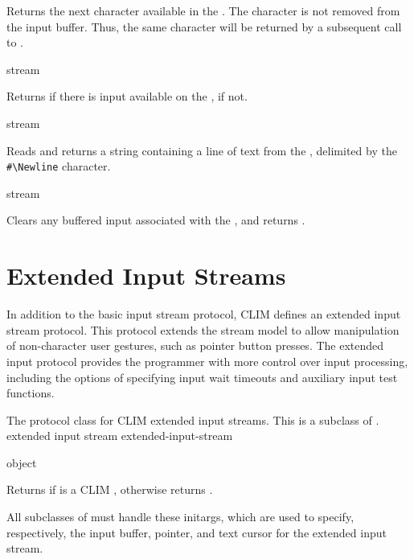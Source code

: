 Returns the next character available in the  .
The character is not removed from the input buffer.  Thus, the same character
will be returned by a subsequent call to .

 {stream}

Returns  if there is input available on the 
,  if not.

 {stream}

Reads and returns a string containing a line of text from the  , delimited by the \verb+#\Newline+ character.

 {stream}

Clears any buffered input associated with the  ,
and returns .


\section {Extended Input Streams}

In addition to the basic input stream protocol, CLIM defines an extended input
stream protocol.  This protocol extends the stream model to allow manipulation
of non-character user gestures, such as pointer button presses.  The extended
input protocol provides the programmer with more control over input processing,
including the options of specifying input wait timeouts and auxiliary input test
functions.


The protocol class for CLIM extended input streams.  This is a subclass of
.
 {extended input stream} {extended-input-stream}

 {object}

Returns  if  is a CLIM ,
otherwise returns .


All subclasses of  must handle these initargs, which
are used to specify, respectively, the input buffer, pointer, and text cursor
for the extended input stream.


